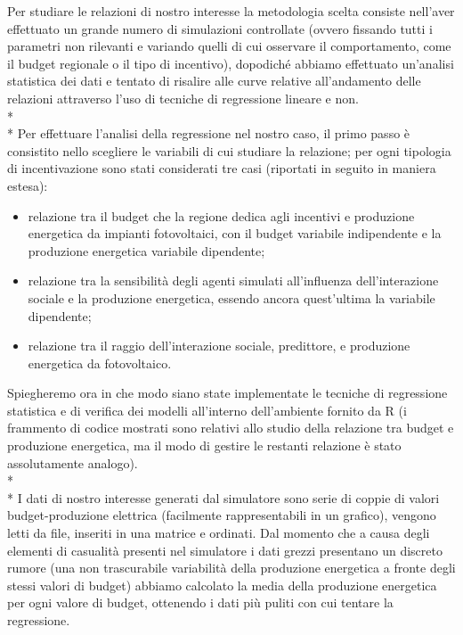 \documentclass[12pt,a4paper,openright,twoside]{report}
\begin{document}
Per studiare le relazioni di nostro interesse la metodologia scelta consiste nell'aver effettuato un grande numero di simulazioni controllate (ovvero fissando tutti i parametri non rilevanti e variando quelli di cui osservare il comportamento, come il budget regionale o il tipo di incentivo), dopodiché abbiamo effettuato un'analisi statistica dei dati e tentato di risalire alle curve relative all'andamento delle relazioni attraverso l'uso di tecniche di regressione lineare e non.\\*\\*
Per effettuare l'analisi della regressione nel nostro caso, il primo passo è consistito nello scegliere le variabili di cui studiare la relazione; per ogni tipologia di incentivazione sono stati considerati tre casi (riportati in seguito in maniera estesa):
\begin{itemize}
\item relazione tra il budget che la regione dedica agli incentivi e produzione energetica da impianti fotovoltaici, con il budget variabile indipendente e la produzione energetica variabile dipendente;
\item relazione tra la sensibilità degli agenti simulati all'influenza dell'interazione sociale e la produzione energetica, essendo ancora quest'ultima la variabile dipendente;
\item relazione tra il raggio dell'interazione sociale, predittore, e produzione energetica da fotovoltaico.
\end{itemize}

Spiegheremo ora in che modo siano state implementate le tecniche di regressione statistica e di verifica dei modelli all'interno dell'ambiente fornito da R (i frammento di codice mostrati sono relativi allo studio della relazione tra budget e produzione energetica, ma il modo di gestire le restanti relazione è stato assolutamente analogo).\\*\\*
I dati di nostro interesse generati dal simulatore sono serie di coppie di valori budget-produzione elettrica (facilmente rappresentabili in un grafico), vengono letti da file, inseriti in una matrice e ordinati. Dal momento che a causa degli elementi di casualità presenti nel simulatore i dati grezzi presentano un discreto rumore (una non trascurabile variabilità della produzione energetica a fronte degli stessi valori di budget) abbiamo calcolato la media della produzione energetica per ogni valore di budget, ottenendo i dati più puliti con cui tentare la regressione.
\end{document}
